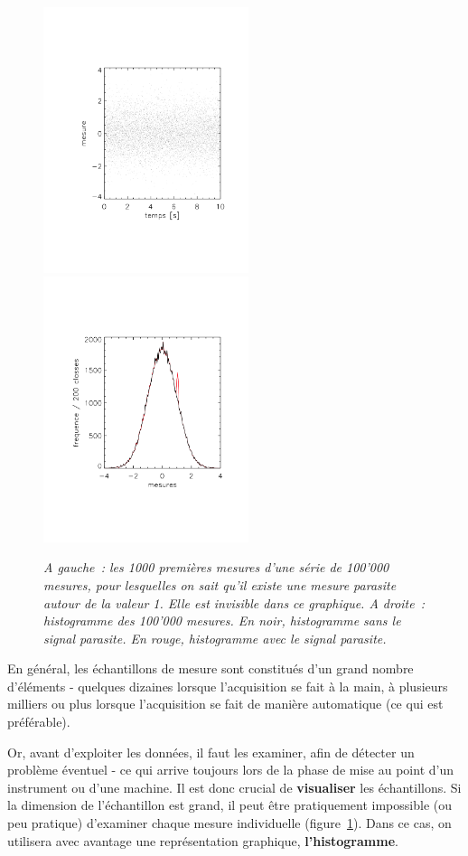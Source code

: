 \begin{figure}[htb]
   \centering
   \vspace{-5mm}
   \includegraphics[width=6cm]{assets/figures/serie1000points.pdf} \hspace{5mm}
   \includegraphics[width=6cm]{assets/figures/serie1000points_histogram.pdf}
   \caption{\it A gauche~: les 1000 premières mesures d'une série de 100'000 mesures, pour lesquelles on sait qu'il existe une mesure parasite autour de la valeur 1. Elle est invisible dans ce graphique. A droite~: histogramme des 100'000 mesures. En noir, histogramme sans le signal parasite. En rouge, histogramme avec le signal parasite.}
   \label{fig:sdp}
\end{figure}
En général, les échantillons de mesure sont constitués d'un grand nombre d'éléments - quelques dizaines lorsque l'acquisition se fait à la main, à plusieurs milliers ou plus lorsque l'acquisition se fait de manière automatique (ce qui est préférable).

Or, avant d'exploiter les données, il faut les examiner, afin de détecter un problème éventuel - ce qui arrive toujours lors de la phase de mise au point d'un instrument ou d'une machine. Il est donc crucial de \textbf{visualiser} les échantillons. Si la dimension de l'échantillon est grand, il peut être pratiquement impossible (ou peu pratique) d'examiner chaque mesure individuelle (figure~\ref{fig:sdp}). Dans ce cas, on utilisera avec avantage une représentation graphique, \textbf{l'histogramme}.

